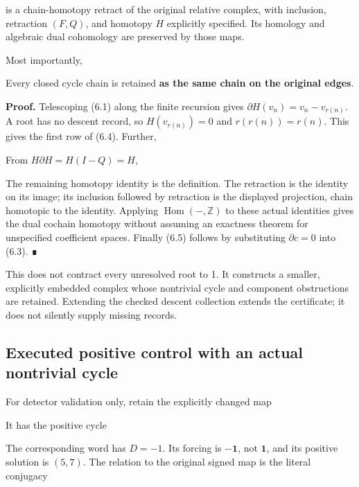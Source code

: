 is a chain-homotopy retract of the original relative complex, with
inclusion, retraction \((F,Q)\), and homotopy \(H\) explicitly
specified. Its homology and algebraic dual cohomology are preserved by
those maps.

Most importantly,


Every closed cycle chain is retained \textbf{as the same chain on the
original edges}.

\textbf{Proof.} Telescoping (6.1) along the finite recursion gives
\(\partial H(v_n)=v_n-v_{r(n)}\). A root has no descent record, so
\(H(v_{r(n)})=0\) and \(r(r(n))=r(n)\). This gives the first row of
(6.4). Further,


From \(H\partial H=H(I-Q)=H\),


The remaining homotopy identity is the definition. The retraction is the
identity on its image; its inclusion followed by retraction is the
displayed projection, chain homotopic to the identity. Applying
\(\operatorname{Hom}(-,\mathbb Z)\) to these actual identities gives the
dual cochain homotopy without assuming an exactness theorem for
unspecified coefficient spaces. Finally (6.5) follows by substituting
\(\partial c=0\) into (6.3). ∎

This does not contract every unresolved root to 1. It constructs a
smaller, explicitly embedded complex whose nontrivial cycle and
component obstructions are retained. Extending the checked descent
collection extends the certificate; it does not silently supply missing
records.

\subsection{Executed positive control with an actual nontrivial cycle}

For detector validation only, retain the explicitly changed map


It has the positive cycle


The corresponding word has \(D=-1\). Its forcing is \(-\mathbf1\), not
\(\mathbf1\), and its positive solution is \((5,7)\). The relation to
the original signed map is the literal conjugacy

